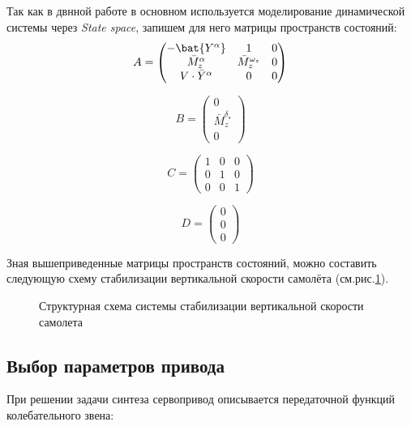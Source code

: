 Так как в двнной работе в основном используется моделирование динамической системы через \textit{State space}, запишем для него матрицы пространств состояний:
$$A = \begin{pmatrix}
-\bat{Y^{\alpha}} & 1 & 0\\ 
\bar{M}_z^\alpha & \bar{M}_z^{\omega_z} & 0\\ 
 V \cdot \bar{Y}^\alpha& 0 & 0 
\end{pmatrix}$$

$$B = \begin{pmatrix}
 0 \\ 
 \bar{M}_z^{\delta_{\text{э}}} \\ 
 0 
\end{pmatrix}$$

$$C= \begin{pmatrix}
1 & 0 & 0\\ 
0 & 1 & 0\\ 
 0& 0 &1 
\end{pmatrix}$$

$$D = \begin{pmatrix}
 0 \\ 
 0 \\ 
 0 
\end{pmatrix}$$

Зная вышеприведенные матрицы пространств состояний, можно составить следующую схему стабилизации вертикальной скорости самолёта (см.рис.\ref{fig:Схема}).


\begin{figure}[H]
    \caption{Структурная схема системы стабилизации вертикальной скорости самолета}
    \label{fig:Схема}
\end{figure}

\subsection{Выбор параметров привода}
    
    При решении задачи синтеза сервопривод описывается передаточной функций колебательного звена:
    
